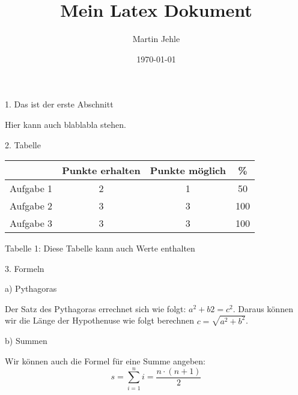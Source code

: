 \documentclass[10pt]{article}
\begin{document}
\begin{titlepage}
\title{Mein Latex Dokument}
\author{Martin Jehle}
\date{\today}
\maketitle

\end{titlepage}
\bigskip

\noindent \Huge 1. Das ist der erste Abschnitt\\
\normalsize \medskip

\noindent Hier kann auch blablabla stehen.
\bigskip

\noindent \Huge 2. Tabelle
\normalsize \medskip
\begin{center}
\begin{tabular}{c|c|c|c}
 & Punkte erhalten & Punkte möglich & \% \\ 
\hline 
Aufgabe 1 & 2 & 1 & 50 \\ 
Aufgabe 2 & 3 & 3 & 100 \\ 
Aufgabe 3 & 3 & 3 & 100 \\ 
\end{tabular}\medskip

Tabelle 1: Diese Tabelle kann auch Werte enthalten 
\end{center}
\bigskip

\noindent \Huge 3. Formeln \normalsize \medskip

\noindent \Large a) Pythagoras\\
\medskip \normalsize

\noindent Der Satz des Pythagoras errechnet sich wie folgt: $a^2+b2=c^2$. Daraus können wir die Länge der Hypothenuse wie folgt berechnen
$c=\sqrt{a^2+b^2}$.
\medskip

\noindent \Large b) Summen\\
\medskip \normalsize

\noindent Wir können auch die Formel für eine Summe angeben:
\begin{equation}
 s=\sum_{i=1}^ni = \frac{n \cdot (n+1)}{2}
\end{equation}
\end{document}
